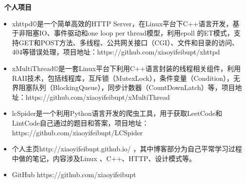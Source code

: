 \documentclass[a4paper,oneside,UTF8, winfonts]{ctexart}
\begin{document}
\noindent \textbf{ \heiti \faCode\ 个人项目}
\begin{itemize}[topsep=0.3em, leftmargin=3pc]
  \setlength{\itemsep}{0pt}
  \setlength{\parsep}{4pt}
  \setlength{\parskip}{4pt}
  \item {} xhttpd©是一个简单高效的HTTP Server，在Linux平台下C++语言开发，基于非阻塞IO、事件驱动和one loop per thread模型，利用epoll 的ET模式，支持GET和POST方法、多线程、公共网关接口（CGI）、文件和目录的访问、404等错误处理，项目地址：https://github.com/xiaoyifeibupt/xhttpd
  \item {}xMultiThread©是一套Linux平台下利用C++语言封装的线程相关组件，利用RAII技术，包括线程库，互斥锁（MutexLock），条件变量（Condition），无界阻塞队列（BlockingQueue），同步计数器（CountDownLatch）等，项目地址：https://github.com/xiaoyifeibupt/xMultiThread
  \item {}lcSpider是一个利用Python语言开发的爬虫工具，用于获取LeetCode和LintCode自己通过的题目和答案，项目地址：https://github.com/xiaoyifeibupt/LCSpider
  \item {}个人主页http://xiaoyifeibupt.github.io/ ，其中博客部分为自己平常学习过程中做的笔记，内容涉及Linux 、C++、HTTP、设计模式等。
  \item {}GitHub https://github.com/xiaoyifeibupt
\end{itemize}
\end{document}
